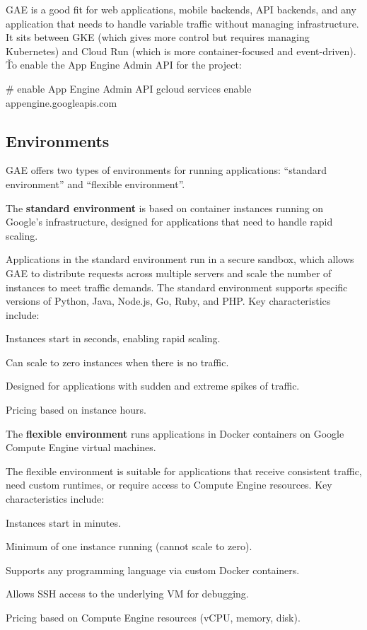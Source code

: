 GAE is a good fit for web applications, mobile backends, API backends, and any application that needs to handle
variable traffic without managing infrastructure. It sits between GKE (which gives more control but requires managing
Kubernetes) and Cloud Run (which is more container-focused and event-driven). \v

To enable the App Engine Admin API for the project:
\begin{bash}
# enable App Engine Admin API
gcloud services enable appengine.googleapis.com
\end{bash}

\subsection{Environments}

GAE offers two types of environments for running applications: ``standard environment'' and ``flexible environment''.

The \textbf{standard environment} is based on container instances running on Google's infrastructure, designed for
applications that need to handle rapid scaling.
\ed

Applications in the standard environment run in a secure sandbox, which allows GAE to distribute requests across
multiple servers and scale the number of instances to meet traffic demands. The standard environment supports specific
versions of Python, Java, Node.js, Go, Ruby, and PHP\@. Key characteristics include:
\bit
\item Instances start in seconds, enabling rapid scaling.
\item Can scale to zero instances when there is no traffic.
\item Designed for applications with sudden and extreme spikes of traffic.
\item Pricing based on instance hours.
\eit

The \textbf{flexible environment} runs applications in Docker containers on Google Compute Engine virtual machines.
\ed

The flexible environment is suitable for applications that receive consistent traffic, need custom runtimes, or require
access to Compute Engine resources. Key characteristics include:
\bit
\item Instances start in minutes.
\item Minimum of one instance running (cannot scale to zero).
\item Supports any programming language via custom Docker containers.
\item Allows SSH access to the underlying VM for debugging.
\item Pricing based on Compute Engine resources (vCPU, memory, disk).
\eit

